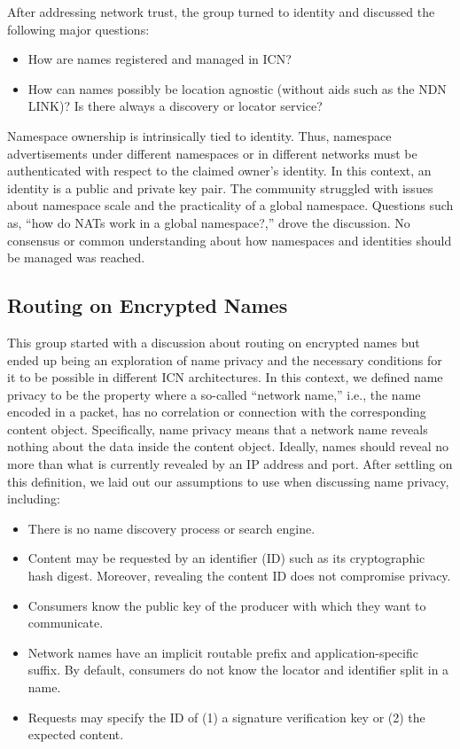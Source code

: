 After addressing network trust, the group turned to identity and discussed the following major questions:
%
\begin{itemize}
\item How are names registered and managed in ICN?
\item How can names possibly be location agnostic (without aids such as the NDN LINK)? Is there always a discovery or locator service?
\end{itemize}
%
Namespace ownership is intrinsically tied to identity. Thus, namespace advertisements under different namespaces or in different networks must be authenticated with respect to the claimed owner's identity. In this context, an identity is a public and private key pair. The community struggled with issues about namespace scale and the practicality of a global namespace. Questions such as, ``how do NATs work in a global namespace?,'' drove the discussion. No consensus or common understanding about how namespaces and identities should be managed was reached.


\subsection{Routing on Encrypted Names}
This group started with a discussion about routing on encrypted names but ended up being an exploration of name privacy and the necessary conditions for it to be possible in different ICN architectures. In this context, we defined name privacy to be the property where a so-called ``network name,'' i.e., the name encoded in a packet, has no correlation or connection with the corresponding content object. Specifically, name privacy means that a network name reveals nothing about the data inside the content object. Ideally, names should reveal no more than what is currently revealed by an IP address and port. After settling on this definition, we laid out our assumptions to use when discussing name privacy, including:

\begin{itemize}
\item There is no name discovery process or search engine.
\item Content may be requested by an identifier (ID) such as its cryptographic hash digest. Moreover, revealing the content ID does not compromise privacy.
\item Consumers know the public key of the producer with which they want to communicate.
\item Network names have an implicit routable prefix and application-specific suffix. By default, consumers do not know the locator and identifier split in a name.
\item Requests may specify the ID of (1) a signature verification key or (2) the expected content.
\end{itemize}

